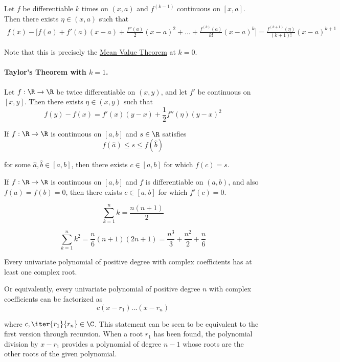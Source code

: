 Let $f$ be differentiable $k$ times on $(x,a)$ and $f^{(k-1)}$ continuous on
$[x,a]$. Then there exists $\eta\in(x,a)$ such that
\begin{align*}
  f(x)-\biggl[f(a)+f'(a)(x-a)+\frac{f''(a)}2(x-a)^2+\ldots+\frac{f^{(k)}(a)}{k!}(x-a)^k\biggr]
  =\frac{f^{(k+1)}(\eta)}{(k+1)!}(x-a)^{k+1}
\end{align*}

Note that this is precisely the \href{d37aa2b}{Mean Value Theorem} at $k=0$.

\paragraph{Taylor's Theorem with $k=1$.}

Let $f:\R\to\R$ be twice differentiable on $(x,y)$, and let $f'$ be continuous
on $[x,y]$. Then there exists $\eta\in(x,y)$ such that
$$
  f(y)-f(x)=f'(x)(y-x)+\frac12f''(\eta)(y-x)^2
$$


\label{d8d9745}

If $f:\R\to\R$ is continuous on $[a,b]$ and $s\in\R$ satisfies
$$
  f(\hat a)\leq s\leq f(\hat b)
$$

for some $\hat a,\hat b\in[a,b]$, then there exists $c\in[a,b]$ for which
$f(c)=s$.

\label{c22360b}

If $f:\R\to\R$ is continuous on $[a,b]$ and $f$ is differentiable on $(a,b)$,
and also $f(a)=f(b)=0$, then there exists $c\in[a,b]$ for which $f'(c)=0$.

\label{f0d0dbb}

$$
  \sum_{k=1}^nk=\frac{n(n+1)}2
$$

\label{d9920cf}

$$
  \sum_{k=1}^nk^2=\frac{n}{6}(n+1)(2n+1)=\frac{n^3}3+\frac{n^2}2+\frac n6
$$

\label{eef914e}

Every univariate polynomial of positive degree with complex coefficients has at
least one complex root.

Or equivalently, every univariate polynomial of positive degree $n$ with
complex coefficients can be factorized as
$$
  c(x-r_1)\ldots(x-r_n)
$$

where $c,\iter{r_1}{r_n}\in\C$. This statement can be seen to be equivalent to
the first version through recursion. When a root $r_1$ has been found, the
polynomial division by $x-r_{1}$ provides a polynomial of degree $n-1$ whose
roots are the other roots of the given polynomial.

